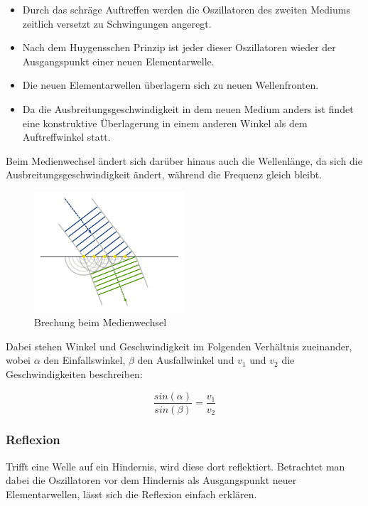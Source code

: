 \documentclass[a4paper]{article}
\begin{document}
					\begin{itemize}
						\item Durch das schräge Auftreffen werden die Oszillatoren des zweiten Mediums zeitlich versetzt zu Schwingungen angeregt.
						\item Nach dem Huygensschen Prinzip ist jeder dieser Oszillatoren wieder der Ausgangspunkt einer neuen Elementarwelle.
						\item Die neuen Elementarwellen überlagern sich zu neuen Wellenfronten.
						\item Da die Ausbreitungsgeschwindigkeit in dem neuen Medium anders ist findet eine konstruktive Überlagerung in einem anderen Winkel als dem Auftreffwinkel statt.
					\end{itemize}
				
					\noindent Beim Medienwechsel ändert sich darüber hinaus auch die Wellenlänge, da sich die Ausbreitungsgeschwindigkeit ändert, während die Frequenz gleich bleibt.
					
					\begin{figure}[H]
						\centering
						\includegraphics[width=0.5\textwidth]{img/brechung.png}
						\caption{Brechung beim Medienwechsel}
						\label{img:brechung}
					\end{figure}
				
					\noindent Dabei stehen Winkel und Geschwindigkeit im Folgenden Verhältnis zueinander, wobei $\alpha$ den Einfallswinkel, $\beta$ den Ausfallwinkel und $v_1$ und $v_2$ die Geschwindigkeiten beschreiben:
				
					\begin{equation}
						\frac{sin(\alpha)}{sin(\beta)}=\frac{v_1}{v_2}
					\end{equation}
					
				\subsubsection{Reflexion}
					Trifft eine Welle auf ein Hindernis, wird diese dort reflektiert. Betrachtet man dabei die Oszillatoren vor dem Hindernis als Ausgangspunkt neuer Elementarwellen, lässt sich die Reflexion einfach erklären. 
					
\end{document}
